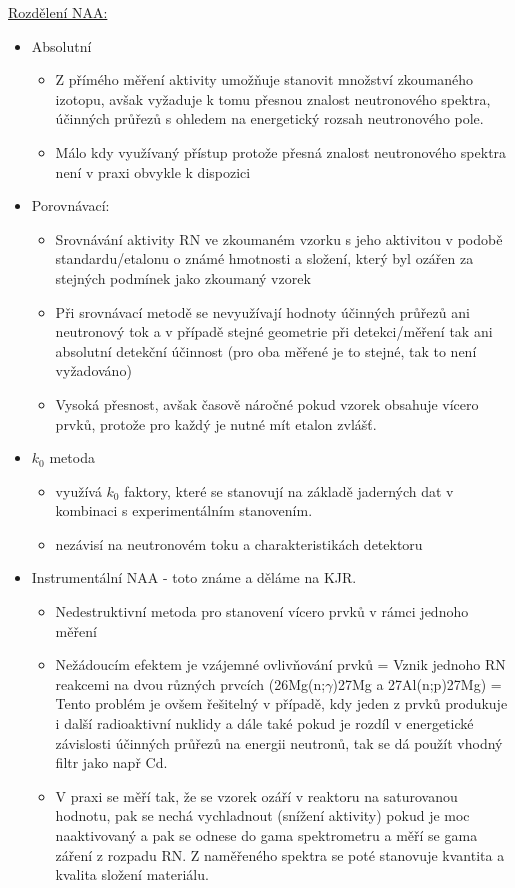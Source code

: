 \underline{Rozdělení NAA:}
\begin{itemize}
    \item Absolutní
    
        \begin{itemize}
            \item Z přímého měření aktivity umožňuje stanovit množství zkoumaného izotopu, avšak vyžaduje k tomu přesnou znalost neutronového spektra, účinných průřezů s ohledem na energetický rozsah neutronového pole.
            \item Málo kdy využívaný přístup protože přesná znalost neutronového spektra není v praxi obvykle k dispozici
        \end{itemize}
    \item Porovnávací:
        \begin{itemize}
            \item Srovnávání aktivity RN ve zkoumaném vzorku s jeho aktivitou v podobě standardu/etalonu o známé hmotnosti a složení, který byl ozářen za stejných podmínek jako zkoumaný vzorek
            \item Při srovnávací metodě se nevyužívají hodnoty účinných průřezů ani neutronový tok a v případě stejné geometrie při detekci/měření tak ani absolutní detekční účinnost (pro oba měřené je to stejné, tak to není vyžadováno)
            \item Vysoká přesnost, avšak časově náročné pokud vzorek obsahuje vícero prvků, protože pro každý je nutné mít etalon zvlášť.

        \end{itemize}
    \item $k_0$ metoda
        \begin{itemize}
            \item využívá $k_0$ faktory, které se stanovují na základě jaderných dat v kombinaci s experimentálním stanovením.
            \item nezávisí na neutronovém toku a charakteristikách detektoru
        \end{itemize}
    \item Instrumentální NAA - toto známe a děláme na KJR.
        \begin{itemize}
            \item Nedestruktivní metoda pro stanovení vícero prvků v rámci jednoho měření
            \item Nežádoucím efektem je vzájemné ovlivňování prvků = Vznik jednoho RN reakcemi na dvou různých prvcích (26Mg(n;$\gamma$)27Mg a 27Al(n;p)27Mg) = Tento problém je ovšem řešitelný v případě, kdy jeden z prvků produkuje i další radioaktivní nuklidy a dále také pokud je rozdíl v energetické závislosti účinných průřezů na energii neutronů, tak se dá použít vhodný filtr jako např Cd.
            \item V praxi se měří tak, že se vzorek ozáří v reaktoru na saturovanou hodnotu, pak se nechá vychladnout (snížení aktivity) pokud je moc naaktivovaný a pak se odnese do gama spektrometru a měří se gama záření z rozpadu RN. Z naměřeného spektra se poté stanovuje kvantita a kvalita složení materiálu.
        \end{itemize}
\end{itemize}

